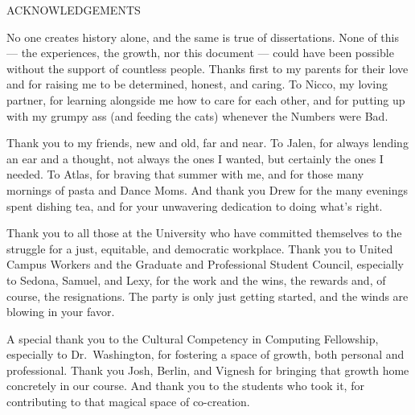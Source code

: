 

%
\pagebreak
\addchaptertocentry{\acknowledgementname} %

\begin{center}
\MakeUppercase{Acknowledgements}\\ \bigskip
\end{center}

No one creates history alone, and the same is true of dissertations.
None of this --- the experiences, the growth, nor this document --- could have been possible without the support of countless people.
Thanks first to my parents for their love and for raising me to be determined, honest, and caring.
To Nicco, my loving partner, for learning alongside me how to care for each other, and for putting up with my grumpy ass (and feeding the cats) whenever the Numbers were Bad.

Thank you to my friends, new and old, far and near.
To Jalen, for always lending an ear and a thought, not always the ones I wanted, but certainly the ones I needed.
To Atlas, for braving that summer with me, and for those many mornings of pasta and Dance Moms.
And thank you Drew for the many evenings spent dishing tea, and for your unwavering dedication to doing what's right.

Thank you to all those at the University who have committed themselves to the struggle for a just, equitable, and democratic workplace.
Thank you to United Campus Workers and the Graduate and Professional Student Council, especially to Sedona, Samuel, and Lexy, for the work and the wins, the rewards and, of course, the resignations.
The party is only just getting started, and the winds are blowing in your favor.

A special thank you to the Cultural Competency in Computing Fellowship, especially to Dr.\ Washington, for fostering a space of growth, both personal and professional.
Thank you Josh, Berlin, and Vignesh for bringing that growth home concretely in our course.
And thank you to the students who took it, for contributing to that magical space of co-creation.


